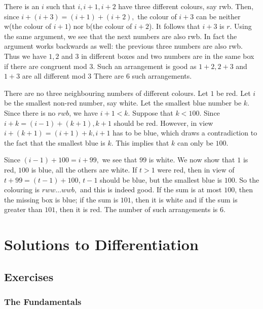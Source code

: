 \documentclass[blue,onecol]{shooting}
\begin{document}
\begin{itemize}
    \Item There is an $i$ such that $i, i + 1, i + 2$ have three different colours, say rwb. Then, since $i + (i + 3) = (i + 1) + (i + 2),$ the colour of $i + 3$ can be neither w(the colour of $i + 1$) nor b(the colour of $i + 2$). It follows that $i + 3$ is $r$. Using the same argument, we see that the next numbers are also rwb. In fact the argument works backwards as well: the previous three numbers are also rwb. Thus we have $1, 2$ and $3$ in different boxes and two numbers are in the same box if there are congruent mod $3$. Such an arrangement is good as $1 + 2, 2 + 3$ and $1 + 3 $ are all different mod $3$ There are $6$ such arrangements.

    \Item There are no three neighbouring numbers of different colours. Let $1$ be red. Let $i$ be the smallest non-red number, say white. Let the smallest blue number be $k$. Since there is no $rwb$, we have $i + 1 < k.$ Suppose that $k < 100$. Since $i + k = (i - 1) + (k + 1), k + 1$ should be red. However, in view  $i + (k + 1) = (i + 1) + k, i + 1$ has to be blue, which draws a contradiction to the fact that the smallest blue is $ k$. This implies that $k$ can only be $100$.

Since $(i - 1) + 100 = i + 99,$ we see that $99$ is white. We now show that $1$ is red, $100$ is blue, all the others are white. If $t > 1$ were red, then in view of $t + 99 = (t - 1) + 100$, $t - 1$ should be blue, but the smallest blue is $100.$ So the colouring is $rww\ldots wwb,$ and this is indeed good. If the sum is at most $100$, then the missing box is blue; if the sum is $101$, then it is white and if the sum is greater than $101$, then it is red. The number of such arrangements is $6$.
\end{itemize}
 

\chapter{Solutions to Differentiation}












\section{Exercises}

\subsection{The Fundamentals}
\end{document}
